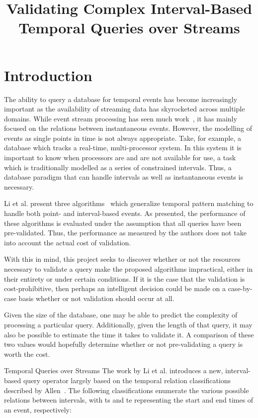 \documentclass[10pt, journal]{IEEEtran}
\title{Validating Complex Interval-Based Temporal Queries over Streams}
\author{\IEEEauthorblockN{Philip Dasler and Sana Malik}
\IEEEauthorblockA{Department of Computer Science\\
University of Maryand\\
College Park, MD 20740\\
\{daslerpc, maliks\}@cs.umd.edu}}
\begin{document}
\maketitle
\section{Introduction}
The ability to query a database for temporal events has become increasingly important as the availability of streaming data has skyrocketed across multiple domains.  While event stream processing has seen much work~\cite{Agrawal:2008, Akdere:2008, Ding:2008, Wu:2006, Brenna:2007, Li:2009, Li:2010, Liu:2009}, it has mainly focused on the relations between instantaneous events.  However, the modelling of events as single points in time is not always appropriate.  Take, for example, a database which tracks a real-time, multi-processor system.  In this system it is important to know when processors are and are not available for use, a task which is traditionally modelled as a series of constrained intervals.  Thus, a database paradigm that can handle intervals as well as instantaneous events is necessary.

Li et al. present three algorithms~\cite{Li:2011} which generalize temporal pattern matching to handle both point- and interval-based events.  As presented, the performance of these algorithms is evaluated under the assumption that all queries have been pre-validated.  Thus, the performance as measured by the authors does not take into account the actual cost of validation.

With this in mind, this project seeks to discover whether or not the resources necessary to validate a query make the proposed algorithms impractical, either in their entirety or under certain conditions.  If it is the case that the validation is cost-prohibitive, then perhaps an intelligent decision could be made on a case-by-case basis whether or not validation should occur at all.  

Given the size of the database, one may be able to predict the complexity of processing a particular query.  Additionally, given the length of that query, it may also be possible to estimate the time it takes to validate it.  A comparison of these two values would hopefully determine whether or not pre-validating a query is worth the cost.  

Temporal Queries over Streams
The work by Li et al. introduces a new, interval-based query operator largely based on the temporal relation classifications described by Allen~\cite{Allen:1983}.  The following classifications enumerate the various possible relations between intervals, with ts and te representing the start and end times of an event, respectively:
\end{document}
